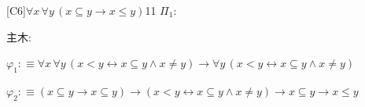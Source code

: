 \begin{fullproof}{[C6]}{$\forall x\,\forall y\,(x \subseteq y \to x \leq y)$}{11}\label{tree:SubLe}
\noindent$\Pi_{1}$:
\begin{ptree}
\end{ptree}
\noindent 主木:
\begin{ptree}
\noLine
{}
\end{ptree}
\begin{abbrevlist}
\item $\varphi_{1} :\equiv \forall x\,\forall y\,(x < y \leftrightarrow x \subseteq y \land x \neq y) \to \forall y\,(x < y \leftrightarrow x \subseteq y \land x \neq y)$
\item $\varphi_{2} :\equiv (x \subseteq y \to x \subseteq y) \to (x < y \leftrightarrow x \subseteq y \land x \neq y) \to x \subseteq y \to x \leq y$
\end{abbrevlist}
\end{fullproof}
